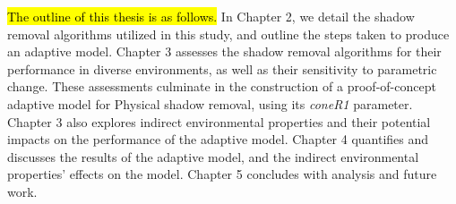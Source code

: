 \documentclass[12pt]{report}
\begin{document}
\hl{The outline of this thesis is as follows.} In Chapter 2, we detail the shadow removal algorithms utilized in this study, and outline the steps taken to produce an adaptive model. Chapter 3 assesses the shadow removal algorithms for their performance in diverse environments, as well as their sensitivity to parametric change. These assessments culminate in the construction of a proof-of-concept adaptive model for Physical shadow removal, using its \textit{coneR1} parameter. Chapter 3 also explores indirect environmental properties and their potential impacts on the performance of the adaptive model. Chapter 4 quantifies and discusses the results of the adaptive model, and the indirect environmental properties' effects on the model. Chapter 5 concludes with analysis and future work. 
\end{document}
